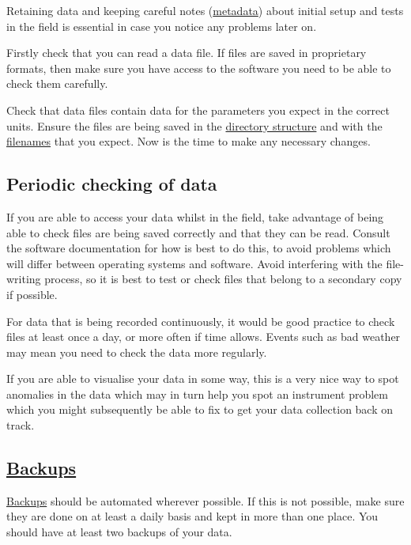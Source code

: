 \documentclass[12pt,a4paper,oneside]{report}
\begin{document}
Retaining data and keeping careful notes
(\protect\hyperlink{metadata}{metadata}) about initial setup and tests
in the field is essential in case you notice any problems later on.

Firstly check that you can read a data file. If files are saved in
proprietary formats, then make sure you have access to the software you
need to be able to check them carefully.

Check that data files contain data for the parameters you expect in the
correct units. Ensure the files are being saved in the
\protect\hyperlink{directory-structure}{directory structure} and with
the \protect\hyperlink{file-naming}{filenames} that you expect. Now is
the time to make any necessary changes.

\hypertarget{periodic-checking-of-data}{%
\subsection{Periodic checking of data}\label{periodic-checking-of-data}}

If you are able to access your data whilst in the field, take advantage
of being able to check files are being saved correctly and that they can
be read. Consult the software documentation for how is best to do this,
to avoid problems which will differ between operating systems and
software. Avoid interfering with the file-writing process, so it is best
to test or check files that belong to a secondary copy if possible.

For data that is being recorded continuously, it would be good practice
to check files at least once a day, or more often if time allows. Events
such as bad weather may mean you need to check the data more regularly.

If you are able to visualise your data in some way, this is a very nice
way to spot anomalies in the data which may in turn help you spot an
instrument problem which you might subsequently be able to fix to get
your data collection back on track.

\hypertarget{backups}{%
\subsection{\texorpdfstring{\protect\hyperlink{backing-up-data}{Backups}}{Backups}}\label{backups}}

\protect\hyperlink{backing-up-data}{Backups} should be automated
wherever possible. If this is not possible, make sure they are done on
at least a daily basis and kept in more than one place. You should have
at least two backups of your data.
\end{document}
